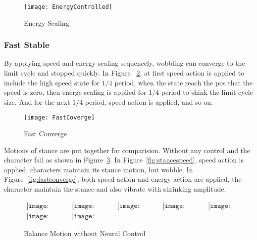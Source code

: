 \begin{figure}[!htbp]
  \begin{center}
      \texttt{[image: EnergyControlled]}
    \caption{Energy Scaling}
    \label{fig:energyscaling}
\end{center}
\end{figure}





\subsubsection*{Fast Stable}
By applying speed and energy scaling sequencely, wobbling can converge to the limit cycle and stopped quickly.
In Figure ~\ref{fig:fastconverg}, at first speed action is applied to include the high speed state for $1/4$ period, when the state reach the pos that the speed is zero, then energe scaling is applied for $1/4$ period to shink the limit cycle size.
And for the next $1/4$ period, speed action is applied, and so on.

\begin{figure}[!htbp]
  \begin{center}
      \texttt{[image: FastCoverge]}
    \caption{Fast Converge}
    \label{fig:fastconverg}
\end{center}
\end{figure}


Motions of stance are put together for comparision.
Without any control and the character fail as shown in Figure~\ref{fig:stancefall}.
In Figure~\ref{fig:stancespeed}, speed action is applied, characters maintain its stance motion, but wobble.
In Figure~\ref{fig:fastconverge}, both speed action and energy action are applied, the character maintain the stance and also vibrate with shrinking amplitude.




\begin{figure}[h]
\begin{center}$
\begin{array}{ccccc}
\texttt{[image: stanceFall/0001.eps]}&
\texttt{[image: stanceFall/0021.eps]}&
\texttt{[image: stanceFall/0041.eps]}&
\texttt{[image: stanceFall/0061.eps]}&
\texttt{[image: stanceFall/0081.eps]}
\\
\texttt{[image: stanceFall/0101.eps]}&
\texttt{[image: stanceFall/0121.eps]}
\end{array}$
\end{center}
\caption{Balance Motion without Neural Control}
    \label{fig:stancefall}
\end{figure}

